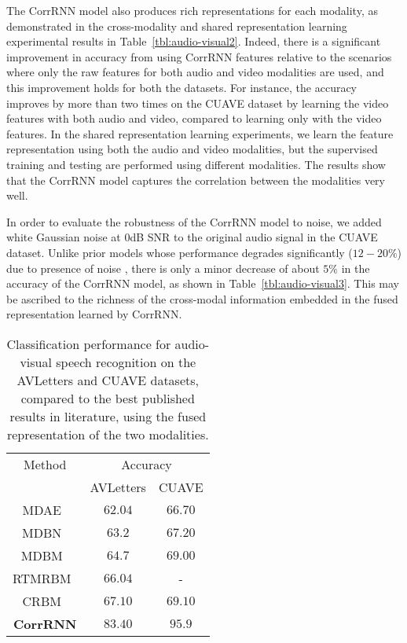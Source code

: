 \documentclass[10pt,twocolumn,letterpaper]{article}
\begin{document}
The CorrRNN model also produces rich representations for each modality, as demonstrated in the cross-modality and shared representation learning experimental results in Table~\ref{tbl:audio-visual2}. Indeed, there is a significant improvement in accuracy from using CorrRNN features relative to the scenarios where only the raw features for both audio and video modalities are used, and this improvement holds for both the datasets. For instance, the accuracy improves by more than two times on the CUAVE dataset by learning the video features with both audio and video, compared to learning only with the video features. In the shared representation learning experiments, we learn the feature representation using both the audio and video modalities, but the supervised training and testing are performed using different modalities. The results show that the CorrRNN model captures the correlation between the modalities very well.   

In order to evaluate the robustness of the CorrRNN model to noise, we added white Gaussian noise at 0dB SNR to the original audio signal in the CUAVE dataset. Unlike prior models whose performance degrades significantly ($12-20\%$) due to presence of noise , there is only a minor decrease of about $5\%$ in the accuracy of the CorrRNN model, as shown in Table~\ref{tbl:audio-visual3}. This may be ascribed to the richness of the cross-modal information embedded in the fused representation learned by CorrRNN. 

\begin{table}
\begin{center}
\begin{tabular}{|c||c|c|}
\hline
 Method & \multicolumn{2}{c|}{Accuracy} \\
 \cline{2-3}
       & AVLetters & CUAVE \\
\hline
\hline
MDAE~\cite{ngiam2011multimodal} & $62.04$ &  $66.70$ \\
\hline
MDBN~\cite{srivastava2012multimodal} &$63.2$ &$67.20$ \\
\hline
MDBM~\cite{srivastava2012multimodal} & $64.7$&$69.00$\\
\hline
RTMRBM~\cite{hu2016temporal} & $66.04$ & -\\
\hline
CRBM~\cite{amer2014multimodal} & $67.10$ & $69.10$ \\
\hline
\textbf{CorrRNN} & $\mathbf{83.40}$ & $\mathbf{95.9}$\\ 
\hline
\end{tabular}
\end{center}
\caption{Classification performance for audio-visual speech recognition on the AVLetters and CUAVE datasets, compared to the best published results in literature, using the fused representation of the two modalities.}
\label{tbl:audio-visual1}
\end{table}
\end{document}
